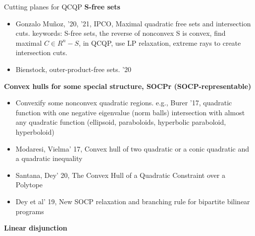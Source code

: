 \begin{frame}{Cutting planes for QCQP}
  \textbf{S-free sets}
  \begin{itemize}
    \item Gonzalo Muñoz, '20, '21, IPCO, Maximal quadratic free sets and intersection cuts. keywords: S-free sets, the reverse of nonconvex S is convex, find maximal \(C \in R^n - S\), in QCQP, use LP relaxation, extreme rays to create intersection cuts.
    \item Bienstock, outer-product-free sets. '20
  \end{itemize}
  \textbf{Convex hulls for some special structure, SOCPr (SOCP-representable)}
  \begin{itemize}
    \item Convexify some nonconvex quadratic regions. e.g., Burer '17, quadratic function with one negative eigenvalue (norm balls) intersection with almost any quadratic function (ellipsoid, paraboloids, hyperbolic paraboloid, hyperboloid)
    \item Modaresi, Vielma' 17, Convex hull of two quadratic or a conic quadratic and a quadratic inequality
    \item Santana, Dey' 20, The Convex Hull of a Quadratic Constraint over a Polytope
    \item Dey et al' 19, New SOCP relaxation and branching rule for bipartite bilinear programs
  \end{itemize}
  \textbf{Linear disjunction}
\end{frame}
